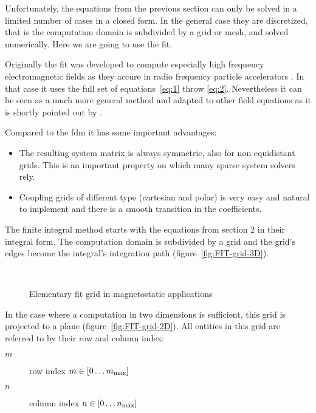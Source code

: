 Unfortunately, the equations from the previous section can only be
solved in a limited number of cases in a closed form.  In the general
case they are discretized, that is the computation domain is
subdivided by a grid or mesh, and solved numerically. Here we are
going to use the \gls{fit}. \par
Originally the \gls{fit} was developed to compute especially high
frequency electromagnetic fields as they accure in radio frequency
particle accelerators \parencite{Weiland:1977}.  In that case it uses
the full set of equations~\eqref{eq:1} throw \eqref{eq:2}.
Nevertheless it can be seen as a much more general method and adapted
to other field equations as it is shortly pointed out by \cite[section
3.4.2]{vanRienen:2010}. \par
Compared to the \gls{fdm} it has some important advantages:
\begin{itemize}
\item The resulting system matrix is always symmetric, also for non
  equidistant grids.  This is an important property on which many
  sparse system solvers rely.
\item Coupling grids of different type (cartesian and polar) is very
  easy and natural to implement and there is a smooth transition in
  the coefficients.
\end{itemize}
\par
The finite integral method starts with the equations from section 2 in
their integral form. The computation domain is subdivided by a grid
and the grid’s edges become the integral’s integration path
(figure~\ref{fig:FIT-grid-3D}).
\begin{figure}
  \begin{maxipage}
    \centering
    \\[\bigskipamount]
    \caption{Elementary \gls{fit} grid in magnetostatic applications}
  \end{maxipage}
\end{figure}
In the case where a computation in two dimensions is sufficient, this
grid is projected to a plane (figure~\ref{fig:FIT-grid-2D}).
All entities in this grid are referred to by their row and column index:
\begin{description}
\item[$m$] row index $m\in\left[0\dots m_{\text{max}}\right]$
\item[$n$] column index $n\in\left[0\dots n_{\text{max}}\right]$
\end{description}
